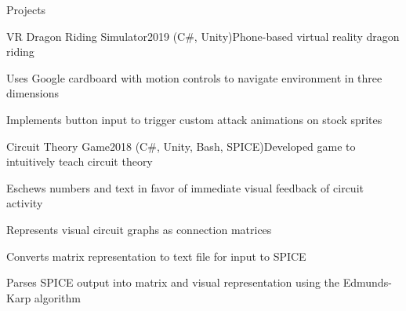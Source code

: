 \documentclass{resume} %
\begin{document}
\begin{rSection}{Projects}
\iffalse
\begin{rWorkSubsection}{The Borden Manor}{2019 - ongoing}{Restoration of a local architectural icon}{}
\item Consulting contractor in the restoration and refurbishment of a nineteenth century Victorian ch\^{a}teau
\item Oversees electrical and plumbing systems maintenance and development
\item Assists in steampunk aesthetic design realization
\item Assists in  reduce, reuse, recycle focused design
\item Drafted whole house floor plans in AutoCAD along with grounds layout
\end{rWorkSubsection}\vspace{-0.5em}
\fi

\begin{rWorkSubsection}{VR Dragon Riding Simulator}{2019 (C\#, Unity)}{Phone-based virtual reality dragon riding}{}
\item Uses Google cardboard with motion controls to navigate environment in three dimensions 
\item Implements button input to trigger custom attack animations on stock sprites
\end{rWorkSubsection}\vspace{-0.5em}

\iffalse
\begin{rWorkSubsection}{Overwatch Gesture}{2019 (Java)}{Leap motion gesture control for Overwatch}{}
\item Intuitively maps Leap Motion-defined hand gestures to game inputs
\end{rWorkSubsection}\vspace{-0.5em}
\fi

\begin{rWorkSubsection}{Circuit Theory Game}{2018 (C\#, Unity, Bash, SPICE)}{Developed game to intuitively teach circuit theory}{}
\item Eschews numbers and text in favor of immediate visual feedback of circuit activity
\item Represents visual circuit graphs as connection matrices
\item Converts matrix representation to text file for input to SPICE
\item Parses SPICE output into matrix and visual representation using the Edmunds-Karp algorithm
\end{rWorkSubsection}\vspace{-0.5em}


\end{rSection}
\end{document}
